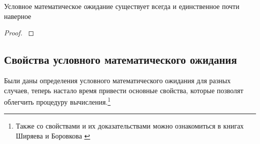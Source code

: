 \begin{comment}
Дальше распишем функцию $\varphi^{\eta}$,
пользуясь формулой \eqref{phiIntegral}
$$\integral{\Delta}{}{x}{
  \varphi^{\eta}\left( x \right) \cdot r\left( x \right)}
  = \integral{\Delta}{}{x}{\left(
      \frac{\integral{\mathbb{R}}{}{y}{y \cdot \pdf{x,y}}}
      {r\left( x \right)}
      \cdot r\left( x \right) \right)}$$

Сократим одинаковые плотности и получим интересный двойной интеграл
$$\integral{\Delta}{}{x}{\left(
      \frac{\integral{\mathbb{R}}{}{y}{y \cdot \pdf{x,y}}}
      {r\left( x \right)}
      \cdot r\left( x \right) \right)}
  = \integral{\Delta}{}{x}{
      \integral{\mathbb{R}}{}{y}{y \cdot \pdf{x,y}}}$$

Вернём индикатор обратно в интеграл
$$\integral{\Delta}{}{x}{
  \integral{\mathbb{R}}{}{y}{y \cdot \pdf{x,y} \cdot}}
  = \integral{\mathbb{R}}{}{x}{
      \integral{\mathbb{R}}{}{y}{y \cdot \indicator{x \in \Delta}
      \cdot \pdf{x,y}}}$$

Видим, что это и есть то математическое ожидание, которое нам нужно
$$\integral{\mathbb{R}}{}{x}{
  \integral{\mathbb{R}}{}{y}{y \cdot \indicator{x \in \Delta}
      \cdot \pdf{x,y}}}
  = \Mean{ \eta \cdot \indicatorof{\xi \in \Delta} }
  = \Mean{ \eta \cdot \indicatorof{A} }$$

Это значит, что тождество доказано и условное математическое ожидание
для случайных величин с совместной плотностью считается с помощью
$$\varphi^{\eta}\left( x \right)
  = \frac{\integral{\mathbb{R}}{}{y}{y \cdot \pdf{x,y}}}
      {\integral{\mathbb{R}}{}{y}{\pdf{x,y}}}$$

По формуле
$$\Mean{ \eta \mcond \xi }
  = \varphi^{\eta}\left( \xi \right)
  = \left. \varphi^{\eta}\left( x \right) \right|_{x= \xi}$$
\end{proof}
\end{comment}
\begin{theorem}
  Условное математическое ожидание существует всегда
  и единственное почти наверное
\end{theorem}
\begin{proof}
\cite[стр.~142]{BorovkovMS}
\end{proof}

\subsection{Свойства условного математического ожидания}
Были даны определения условного математического ожидания для разных случаев,
теперь настало время привести основные свойства,
которые позволят облегчить процедуру вычисления.\footnote{Также
со свойствами и их доказательствами можно ознакомиться в книгах
Ширяева \cite[стр.~270]{Shiryayev1} и Боровкова \cite[стр.~143]{BorovkovMS}
}

